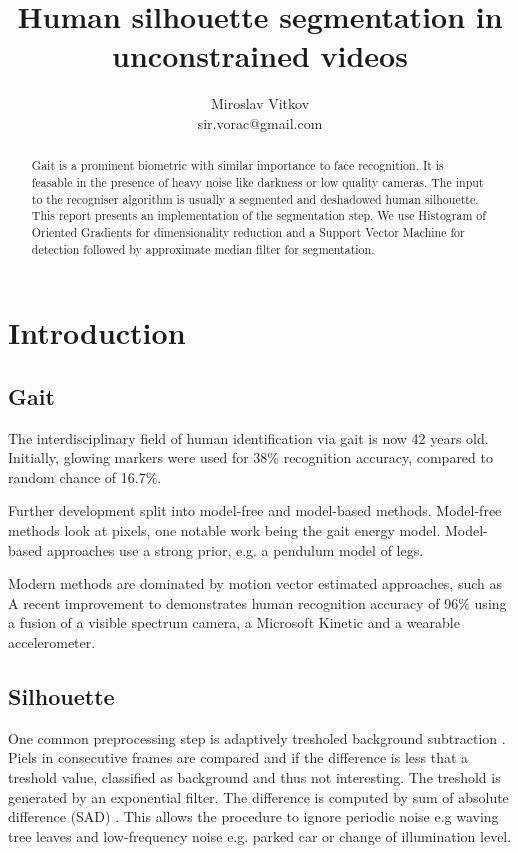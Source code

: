 \documentclass{article}
\title{Human silhouette segmentation in unconstrained videos}
\author{Miroslav Vitkov \\ sir.vorac@gmail.com}
\begin{document}
\maketitle


\begin{abstract}
Gait is a prominent biometric with similar importance to face recognition.
It is feasable in the presence of heavy noise like darkness or low quality cameras.
The input to the recogniser algorithm is usually a segmented and deshadowed human silhouette.
This report presents an implementation of the segmentation step.
We use Histogram of Oriented Gradients for dimensionality reduction and a Support Vector Machine for detection followed by approximate median filter for segmentation.
\end{abstract}


\section{Introduction}
\subsection{Gait}
The interdisciplinary field of human identification via gait is now 42 years old.
Initially, glowing markers were used\cite{begin} for 38\% recognition accuracy, compared to random chance of 16.7\%.

Further development split into model-free and model-based methods.
Model-free methods look at pixels, one notable work being the gait energy model\cite{energy}.
Model-based approaches use a strong prior, e.g. a pendulum model of legs\cite{pendulum}.

Modern methods are dominated by motion vector estimated approaches, such as \cite{pyramid}
A recent improvement to \cite{pyramid} demonstrates human recognition accuracy of 96\% using a fusion of a visible spectrum camera, a Microsoft Kinetic and a wearable accelerometer\cite{robust}.


\subsection{Silhouette}
One common preprocessing step is adaptively tresholed background subtraction \cite{vehicle}.
Piels in consecutive frames are compared and if the difference is less that a treshold value, classified as background and thus not interesting.
The treshold is generated by an exponential filter.
The difference is computed by sum of absolute difference (SAD) \cite{background}.
This allows the procedure to ignore periodic noise e.g waving tree leaves and low-frequency noise e.g. parked car or change of illumination level.
\end{document}
